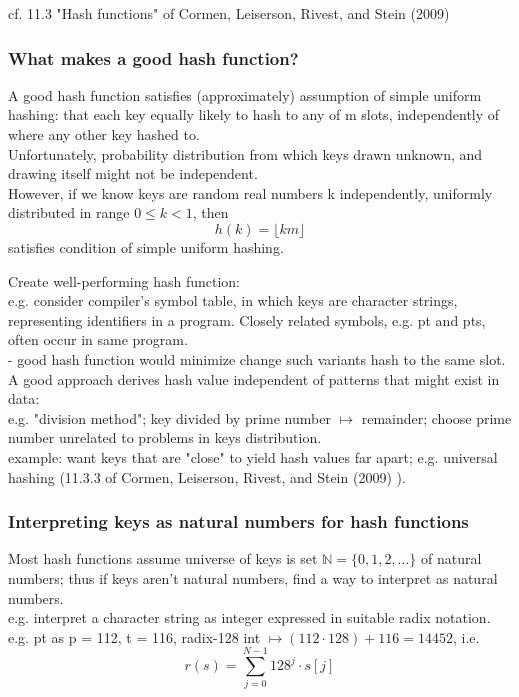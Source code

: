 \documentclass[10pt]{amsart}
\begin{document}
\begin{multicols*}{2}
cf. 11.3 "Hash functions" of Cormen, Leiserson, Rivest, and Stein (2009) \cite{CLRS2009}

\subsubsection{What makes a good hash function?}

A good hash function satisfies (approximately) assumption of simple uniform hashing: that each key equally likely to hash to any of m slots, independently of where any other key hashed to. \\
Unfortunately, probability distribution from which keys drawn unknown, and drawing itself might not be independent. \\

However, if we know keys are random real numbers k independently, uniformly distributed in range $0\leq k < 1$, then
\begin{equation}
h(k) = \lfloor km \rfloor
\end{equation}
satisfies condition of simple uniform hashing.

Create well-performing hash function: \\
e.g. consider compiler's symbol table, in which keys are character strings, representing identifiers in a program. Closely related symbols, e.g. pt and pts, often occur in same program. \\
- good hash function would minimize change such variants hash to the same slot. \\

A good approach derives hash value independent of patterns that might exist in data: \\
e.g. "division method"; key divided by prime number $\mapsto$ remainder; choose prime number unrelated to problems in keys distribution. \\

example: want keys that are "close" to yield hash values far apart; e.g. universal hashing (11.3.3 of Cormen, Leiserson, Rivest, and Stein (2009) \cite{CLRS2009}).

\subsubsection{Interpreting keys as natural numbers for hash functions}

Most hash functions assume universe of keys is set $\mathbb{N} = \lbrace 0, 1,2, \dots \rbrace$ of natural numbers; thus if keys aren't natural numbers, find a way to interpret as natural numbers. \\
e.g. interpret a character string as integer expressed in suitable radix notation. \\
e.g. pt as p = 112, t = 116, radix-128 int $\mapsto (112 \cdot 128) + 116 = 14452$, i.e.
\[
r(s) = \sum_{j=0}^{N- 1} 128^j \cdot s[j]
\]


\end{multicols*}
\end{document}
